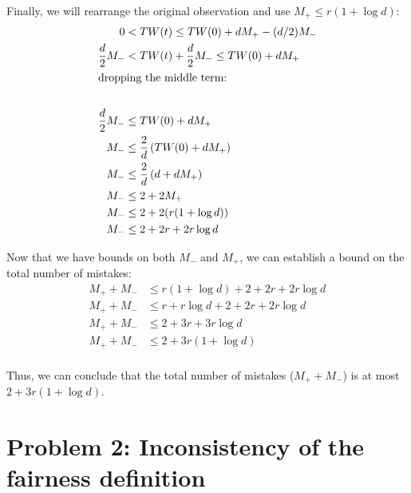 \documentclass[twoside,11pt]{homework}
\DeclarePairedDelimiter{\2norm}{\lVert}{\rVert^2_2}
\newcommand{\1}[1]{\mathds{1}\left[#1\right]}
\begin{document}
\begin{enumerate}[\bf (i)]
	Finally, we will rearrange the original observation and use
	$M_{+} \leq r(1+\log d)$:
	\begin{align*}
	0 &< TW(t) \leq TW(0) + dM_{+} - (d/2)M_{-} \\
	\frac{d}{2}M_{-} &< TW(t) + \frac{d}{2}M_{-} \leq TW(0) + dM_{+} \\
	\intertext{dropping the middle term:} \\
	\frac{d}{2}M_{-} &\leq TW(0) + dM_{+} \\
	M_{-} &\leq \frac{2}{d}\left(TW(0) + dM_{+}\right) \\
	M_{-} &\leq \frac{2}{d}\left(d + dM_{+}\right) \\
	M_{-} &\leq 2 + 2M_{+} \\
	M_{-} &\leq 2 + 2(r (1 + \log d)) \\
	M_{-} &\leq 2 + 2r + 2r\log d \\
	\end{align*}
	
	Now that we have bounds on both $M_{-}$ and $M_{+}$, we can establish a
	bound on the total number of mistakes:
	\begin{align*}
	M_{+} + M_{-} &\leq r(1+\log d) + 2 + 2r + 2r\log d \\
	M_{+} + M_{-} &\leq r + r\log d + 2 + 2r + 2r\log d \\
	M_{+} + M_{-} &\leq 2 + 3r + 3r\log d \\
	M_{+} + M_{-} &\leq 2 + 3r(1 + \log d) \\
	\end{align*}
	
	Thus, we can conclude that the total number of mistakes ($M_{+} + M_{-}$) is
	at most $2 + 3r(1 + \log d)$.
	
\end{enumerate}

\section*{Problem 2: Inconsistency of the fairness definition}
\end{document}
